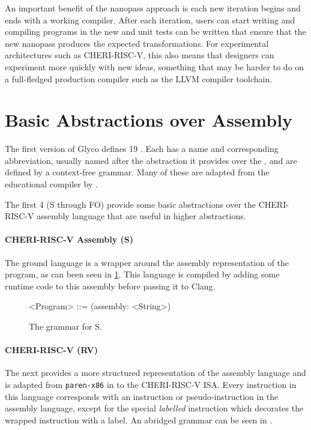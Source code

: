 \documentclass[main.tex]{subfiles}
\begin{document}
An important benefit of the nanopass approach is each new iteration begins and ends with a working compiler. After each iteration, users can start writing and compiling programs in the new \il{} and unit tests can be written that ensure that the new \gls{nanopass} produces the expected transformations. For experimental architectures such as CHERI-RISC-V, this also means that designers can experiment more quickly with new ideas, something that may be harder to do on a full-fledged production compiler such as the LLVM compiler toolchain.

\section{Basic Abstractions over Assembly}
The first version of Glyco defines 19 \ils{}. Each \il{} has a name and corresponding abbreviation, usually named after the abstraction it provides over the \lowerlang{}, and are defined by a context-free grammar. Many of these \ils{} are adapted from the educational compiler by \cite{compcourse}.

The first 4 \ils{} (S through FO) provide some basic abstractions over the CHERI-RISC-V assembly language that are useful in higher abstractions.

\paragraph{CHERI-RISC-V Assembly (S)} The ground language is a wrapper around the assembly representation of the program, as can been seen in \cref{bnf:s}. This language is compiled by adding some runtime code to this assembly before passing it to Clang.
\begin{figure}[ht]
	\begin{grammar}
		<Program> ::= (assembly: <String>)
	\end{grammar}
	\caption{The grammar for S.}
	\label{bnf:s}
\end{figure}

\paragraph{CHERI-RISC-V (RV)} The next \il{} provides a more structured representation of the assembly language and is adapted from \texttt{paren-x86} in \cite{compcourse} to the CHERI-RISC-V ISA. Every instruction in this language corresponds with an instruction or pseudo-instruction in the assembly language, except for the special \emph{labelled} instruction which decorates the wrapped instruction with a label. An abridged grammar can be seen in .
\end{document}
